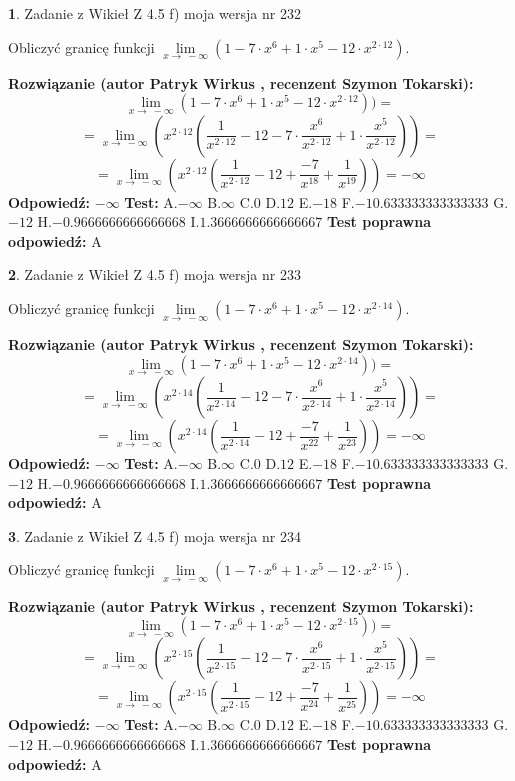 \documentclass[12pt, a4paper]{article}
\theoremstyle{definition} %
\newtheorem{zad}{}
\newcommand{\zadStart}[1]{\begin{zad}#1\newline}
\newcommand{\zadStop}{\end{zad}}
\newcommand{\rozwStart}[2]{\noindent \textbf{Rozwiązanie (autor #1 , recenzent #2): }\newline}
\newcommand{\rozwStop}{\newline}
\newcommand{\odpStart}{\noindent \textbf{Odpowiedź:}\newline}
\newcommand{\odpStop}{\newline}
\newcommand{\testStart}{\noindent \textbf{Test:}\newline}
\newcommand{\testStop}{\newline}
\newcommand{\kluczStart}{\noindent \textbf{Test poprawna odpowiedź:}\newline}
\newcommand{\kluczStop}{\newline}
\begin{document}
\zadStart{Zadanie z Wikieł Z 4.5 f) moja wersja nr 232}


Obliczyć granicę funkcji  $\lim\limits_{x\to\ -\infty}(1 - 7 \cdot x^{6}+1 \cdot x^{5}- 12 \cdot x^{2\cdot12})$.
\zadStop
\rozwStart{Patryk Wirkus}{Szymon Tokarski}
$$\lim\limits_{x\to\ -\infty}(1 - 7 \cdot x^{6}+1 \cdot x^{5}- 12 \cdot x^{2\cdot12}))=$$
$$=\lim\limits_{x\to\ -\infty}(x^{2\cdot12}(\frac{1}{x^{2\cdot12}}-12 -7 \cdot \frac{x^{6}}{x^{2\cdot12}}+1 \cdot \frac{x^{5}}{x^{2\cdot12}}))=$$
$$=\lim\limits_{x\to\ -\infty}(x^{2\cdot12}(\frac{1}{x^{2\cdot12}}-12 + \frac{-7}{x^{18}}+ \frac{1}{x^{19}}))=-\infty$$
\rozwStop
\odpStart
$-\infty$
\odpStop
\testStart
A.$-\infty$ B.$\infty$ C.$0$ D.$12$ E.$-18$
F.$-10.633333333333333$ G.$-12$
H.$-0.9666666666666668$
I.$1.3666666666666667$
\testStop
\kluczStart
A
\kluczStop



\zadStart{Zadanie z Wikieł Z 4.5 f) moja wersja nr 233}


Obliczyć granicę funkcji  $\lim\limits_{x\to\ -\infty}(1 - 7 \cdot x^{6}+1 \cdot x^{5}- 12 \cdot x^{2\cdot14})$.
\zadStop
\rozwStart{Patryk Wirkus}{Szymon Tokarski}
$$\lim\limits_{x\to\ -\infty}(1 - 7 \cdot x^{6}+1 \cdot x^{5}- 12 \cdot x^{2\cdot14}))=$$
$$=\lim\limits_{x\to\ -\infty}(x^{2\cdot14}(\frac{1}{x^{2\cdot14}}-12 -7 \cdot \frac{x^{6}}{x^{2\cdot14}}+1 \cdot \frac{x^{5}}{x^{2\cdot14}}))=$$
$$=\lim\limits_{x\to\ -\infty}(x^{2\cdot14}(\frac{1}{x^{2\cdot14}}-12 + \frac{-7}{x^{22}}+ \frac{1}{x^{23}}))=-\infty$$
\rozwStop
\odpStart
$-\infty$
\odpStop
\testStart
A.$-\infty$ B.$\infty$ C.$0$ D.$12$ E.$-18$
F.$-10.633333333333333$ G.$-12$
H.$-0.9666666666666668$
I.$1.3666666666666667$
\testStop
\kluczStart
A
\kluczStop



\zadStart{Zadanie z Wikieł Z 4.5 f) moja wersja nr 234}


Obliczyć granicę funkcji  $\lim\limits_{x\to\ -\infty}(1 - 7 \cdot x^{6}+1 \cdot x^{5}- 12 \cdot x^{2\cdot15})$.
\zadStop
\rozwStart{Patryk Wirkus}{Szymon Tokarski}
$$\lim\limits_{x\to\ -\infty}(1 - 7 \cdot x^{6}+1 \cdot x^{5}- 12 \cdot x^{2\cdot15}))=$$
$$=\lim\limits_{x\to\ -\infty}(x^{2\cdot15}(\frac{1}{x^{2\cdot15}}-12 -7 \cdot \frac{x^{6}}{x^{2\cdot15}}+1 \cdot \frac{x^{5}}{x^{2\cdot15}}))=$$
$$=\lim\limits_{x\to\ -\infty}(x^{2\cdot15}(\frac{1}{x^{2\cdot15}}-12 + \frac{-7}{x^{24}}+ \frac{1}{x^{25}}))=-\infty$$
\rozwStop
\odpStart
$-\infty$
\odpStop
\testStart
A.$-\infty$ B.$\infty$ C.$0$ D.$12$ E.$-18$
F.$-10.633333333333333$ G.$-12$
H.$-0.9666666666666668$
I.$1.3666666666666667$
\testStop
\kluczStart
A
\kluczStop
\end{document}
